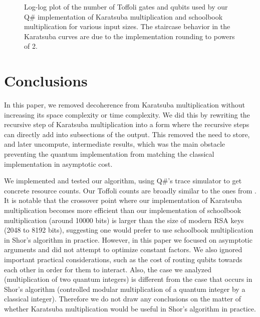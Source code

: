 \documentclass[onecolumn]{quantumarticle}
\begin{document}
\begin{figure}
    \centering
    \caption{
    \label{fig:data}
    Log-log plot of the number of Toffoli gates and qubits used by our Q\# implementation of Karatsuba multiplication and schoolbook multiplication for various input sizes.
    The staircase behavior in the Karatsuba curves are due to the implementation rounding to powers of 2.
    }
\end{figure}

\section{Conclusions}
\label{sec:conclusion}

In this paper, we removed decoherence from Karatsuba multiplication without increasing its space complexity or time complexity.
We did this by rewriting the recursive step of Karatsuba multiplication into a form where the recursive steps can directly add into subsections of the output.
This removed the need to store, and later uncompute, intermediate results, which was the main obstacle preventing the quantum implementation from matching the classical implementation in asymptotic cost.

We implemented and tested our algorithm, using Q\#'s trace simulator to get concrete resource counts.
Our Toffoli counts are broadly similar to the ones from \cite{parent2017karatsuba}.
It is notable that the crossover point where our implementation of Karatsuba multiplication becomes more efficient than our implementation of schoolbook multiplication (around 10000 bits) is larger than the size of modern RSA keys (2048 to 8192 bits), suggesting one would prefer to use schoolbook multiplication in Shor's algorithm in practice.
However, in this paper we focused on asymptotic arguments and did not attempt to optimize constant factors.
We also ignored important practical considerations, such as the cost of routing qubits towards each other in order for them to interact.
Also, the case we analyzed (multiplication of two quantum integers) is different from the case that occurs in Shor's algorithm (controlled modular multiplication of a quantum integer by a classical integer).
Therefore we do not draw any conclusions on the matter of whether Karatsuba multiplication would be useful in Shor's algorithm in practice.
\end{document}
